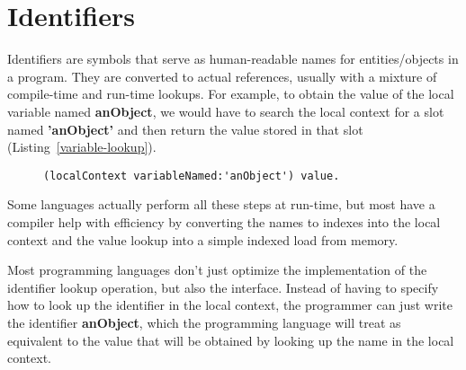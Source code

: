 \documentclass[preprint,authoryear]{acm_proc_article-sp}
\begin{document}
\section{Identifiers}
\label{identifiers}

Identifiers are symbols that serve as human-readable names for entities/objects
in a program.  They are converted to actual references, usually with a mixture of
compile-time and run-time lookups.  For example, to obtain the value of the local
variable named {\bf anObject}, we would have to search the local context for
a slot named {\bf 'anObject'} and then return the value stored in that slot (Listing~\ref{variable-lookup}).


\begin{figure}[htbp]
\begin{lstlisting}[style=L,label=variable-lookup,caption=Lookup of a local variable.]
  (localContext variableNamed:'anObject') value.
\end{lstlisting}
\end{figure}

Some  languages actually perform all these steps at run-time, but most 
have a compiler help with efficiency by converting the names to indexes into
the local context and the value lookup into a simple indexed load from memory.

Most programming languages don't just optimize the implementation of the identifier
lookup operation, but also the interface.  Instead of having to specify how to
look up the identifier in the local context, the programmer can just write the
identifier {\bf anObject}, which the programming language will treat as equivalent to the
value that will be obtained by looking up the name in the local context.  
\end{document}
